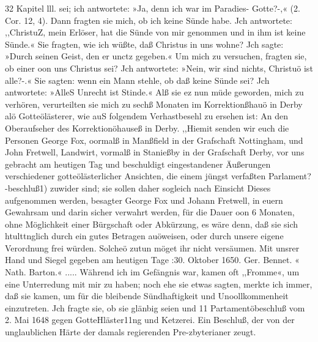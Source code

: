 32 Kapitel lll.
sei; ich antwortete: »Ja, denn ich war im Paradies- Gotte?-,«
(2. Cor. 12, 4). Dann fragten sie mich, ob ich keine Sünde habe.
Jch antwortete: ,,ChristuZ, mein Erlöser, hat die Sünde von mir
genommen und in ihm ist keine Sünde.« Sie fragten, wie ich
wüßte, daß Christus in uns wohne? Jch sagte: »Durch seinen
Geist, den er unctz gegeben.« Um mich zu versuchen, fragten sie,
ob einer oon uns Christus sei? Jch antwortete: »Nein, wir
sind nichts, Christuö ist alle?-.« Sie sagten: wenn ein Mann
stehle, ob daß keine Sünde sei? Jch antwortete: »AlleS Unrecht
ist Stinde.« Alß sie ez nun müde geworden, mich zu verhören,
verurteilten sie mich zu sechß Monaten im Korrektionßhauö in
Derby alö Gotteölästerer, wie auS folgendem Verhastbesehl zu
ersehen ist:
An den Oberaufseher des Korrektionöhauseß in Derby.
,,Hiemit senden wir euch die Personen George Fox, oormalß
in Manßfield in der Grafschaft Nottingham, und John Fretwell,
Landwirt, vormalß in Stanießby in der Grafschaft Derby, vor
uns gebracht am heutigen Tag und beschuldigt eingestandener
Äußerungen verschiedener gotteölästerlicher Ansichten, die einem
jüngst verfaßten Parlament?-beschluß1) zuwider sind; sie sollen daher
sogleich nach Einsicht Dieses aufgenommen werden, besagter
George Fox und Johann Fretwell, in euern Gewahrsam und
darin sicher verwahrt werden, für die Dauer oon 6 Monaten,
ohne Möglichkeit einer Bürgschaft oder Abkürzung, es wäre denn,
daß sie sich htulttnglich durch ein gutes Betragen auöweisen, oder
durch unsere eigene Verordnung frei würden. Solcheö zutun
möget ihr nicht versäumen.
Mit unsrer Hand und Siegel gegeben am heutigen Tage
:30. Oktober 1650. Ger. Bennet. «
Nath. Barton.« .....
Während ich im Gefängnis war, kamen oft ,,Fromme«, um eine
Unterredung mit mir zu haben; noch ehe sie etwas sagten, merkte
ich immer, daß sie kamen, um für die bleibende Sündhaftigkeit und
Unoollkommenheit einzutreten. Jch fragte sie, ob sie glänbig seien und
11 Partamentöbeschluß vom 2. Mai 1648 gegen GotteHläster11ng und
Ketzerei. Ein Beschluß, der von der unglaublichen Härte der damals regierenden
Pre-zbyterianer zeugt.


